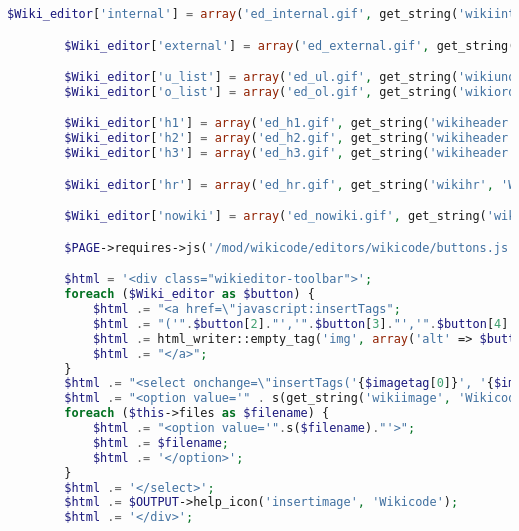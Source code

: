 \begin{lstlisting}[language=PHP]
        $Wiki_editor['internal'] = array('ed_internal.gif', get_string('wikiinternalurl', 'Wikicode'), $tag[0], $tag[1], get_string('wikiinternalurl', 'Wikicode'));

        $Wiki_editor['external'] = array('ed_external.gif', get_string('wikiexternalurl', 'Wikicode'), $tag, "", get_string('wikiexternalurl', 'Wikicode'));

        $Wiki_editor['u_list'] = array('ed_ul.gif', get_string('wikiunorderedlist', 'Wikicode'), '\\n'.$tag[0], '', '');
        $Wiki_editor['o_list'] = array('ed_ol.gif', get_string('wikiorderedlist', 'Wikicode'), '\\n'.$tag[1], '', '');

        $Wiki_editor['h1'] = array('ed_h1.gif', get_string('wikiheader', 'Wikicode', 1), '\\n'.$tag.' ', ' '.$tag.'\\n', get_string('wikiheader', 'Wikicode', 1));
        $Wiki_editor['h2'] = array('ed_h2.gif', get_string('wikiheader', 'Wikicode', 2), '\\n'.$tag.$tag.' ', ' '.$tag.$tag.'\\n', get_string('wikiheader', 'Wikicode', 2));
        $Wiki_editor['h3'] = array('ed_h3.gif', get_string('wikiheader', 'Wikicode', 3), '\\n'.$tag.$tag.$tag.' ', ' '.$tag.$tag.$tag.'\\n', get_string('wikiheader', 'Wikicode', 3));

        $Wiki_editor['hr'] = array('ed_hr.gif', get_string('wikihr', 'Wikicode'), '\\n'.$tag.'\\n', '', '');

        $Wiki_editor['nowiki'] = array('ed_nowiki.gif', get_string('wikinowikitext', 'Wikicode'), $tag[0], $tag[1], get_string('wikinowikitext', 'Wikicode'));

        $PAGE->requires->js('/mod/wikicode/editors/wikicode/buttons.js');

        $html = '<div class="wikieditor-toolbar">';
        foreach ($Wiki_editor as $button) {
            $html .= "<a href=\"javascript:insertTags";
            $html .= "('".$button[2]."','".$button[3]."','".$button[4]."');\">";
            $html .= html_writer::empty_tag('img', array('alt' => $button[1], 'src' => $CFG->wwwroot . '/mod/wikicode/editors/wikicode/images/' . $button[0]));
            $html .= "</a>";
        }
        $html .= "<select onchange=\"insertTags('{$imagetag[0]}', '{$imagetag[1]}', this.value)\">";
        $html .= "<option value='" . s(get_string('wikiimage', 'Wikicode')) . "'>" . get_string('insertimage', 'Wikicode') . '</option>';
        foreach ($this->files as $filename) {
            $html .= "<option value='".s($filename)."'>";
            $html .= $filename;
            $html .= '</option>';
        }
        $html .= '</select>';
        $html .= $OUTPUT->help_icon('insertimage', 'Wikicode');
        $html .= '</div>';


\end{lstlisting}
